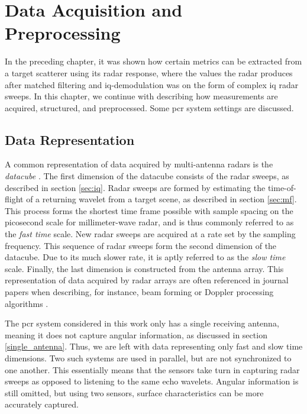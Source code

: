 \chapter{Data Acquisition and Preprocessing}\label{ch:3}

In the preceding chapter, it was shown how certain metrics can be extracted from a target scatterer using its radar response, where the values the radar produces after matched filtering and \gls{iq}-demodulation was on the form of complex \gls{iq} radar sweeps. In this chapter, we continue with describing how measurements are acquired, structured, and preprocessed. Some \gls{pcr} system settings are discussed.

\section{Data Representation}

A common representation of data acquired by multi-antenna radars is the \emph{datacube} \citep{richards_2014}. The first dimension of the datacube consists of the radar sweeps, as described in section \ref{sec:iq}. Radar sweeps are formed by estimating the time-of-flight of a returning wavelet from a target scene, as described in section \ref{sec:mf}. This process forms the shortest time frame possible with sample spacing on the picosecond scale for millimeter-wave radar, and is thus commonly referred to as the \emph{fast time} scale. New radar sweeps are acquired at a rate set by the sampling frequency. This sequence of radar sweeps form the second dimension of the datacube. Due to its much slower rate, it is aptly referred to as the \emph{slow time} scale. Finally, the last dimension is constructed from the antenna array. This representation of data acquired by radar arrays are often referenced in journal papers when describing, for instance, beam forming or Doppler processing algorithms \citep{gentile_donovan_2018}. 

The \gls{pcr} system considered in this work only has a single receiving antenna, meaning it does not capture angular information, as discussed in section \ref{single_antenna}. Thus, we are left with data representing only fast and slow time dimensions. Two such systems are used in parallel, but are not synchronized to one another. This essentially means that the sensors take turn in capturing radar sweeps as opposed to listening to the same echo wavelets. Angular information is still omitted, but using two sensors, surface characteristics can be more accurately captured.



